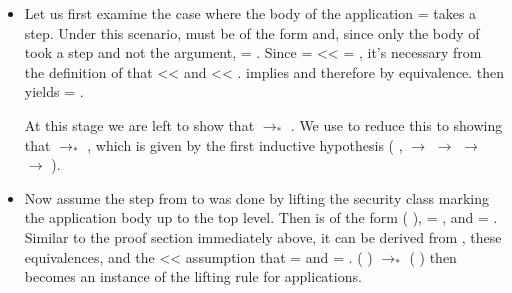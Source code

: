 \documentclass[12pt]{report}
\begin{document}
\begin{itemize}

\item  Let us first examine the case where the body of the
    application  =  
         takes a step. Under this scenario,
         must be of the form 
          and, since only the body
        of  took a step and not the argument,
         = . Since 
        =    <<
          
        = , it's necessary from the definition of
         that  <<
         and  << .
          implies 
         and therefore 
         by equivalence.
         then yields
         = .


    At this stage we are left to show that 
          $\to_*$ 
         . We use
         to reduce this to showing that
         $\to_*$ , which is given by
        the first inductive hypothesis
        (\coqdockw{\ensuremath{\forall}} ,
          \ensuremath{\rightarrow}
         $\to$  \ensuremath{\rightarrow}
         $\to$ ).



\item  Now assume the step from  to  was
    done by lifting the security class marking the application body
        up to the top level. Then  is of the form
          (
         ), 
        = , and  = .
        Similar to the proof section immediately above, it can be
        derived from  , these
        equivalences, and the  << 
        assumption that  =  and
         = . 
        (  )
         $\to_*$  
        (  ) then
        becomes an instance of the  lifting rule for
        applications.




\end{itemize}
\end{document}
